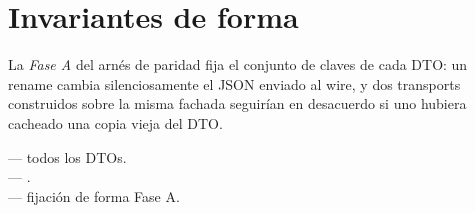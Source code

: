 \section{Invariantes de forma}

La \emph{Fase A} del arnés de paridad fija el conjunto de
claves de cada DTO: un rename cambia silenciosamente el JSON
enviado al wire, y dos transports construidos sobre la misma
fachada seguirían en desacuerdo si uno hubiera cacheado una
copia vieja del DTO.

\begin{inthecode}
 --- todos los DTOs.\\
 --- .\\
 ---
fijación de forma Fase A.
\end{inthecode}
